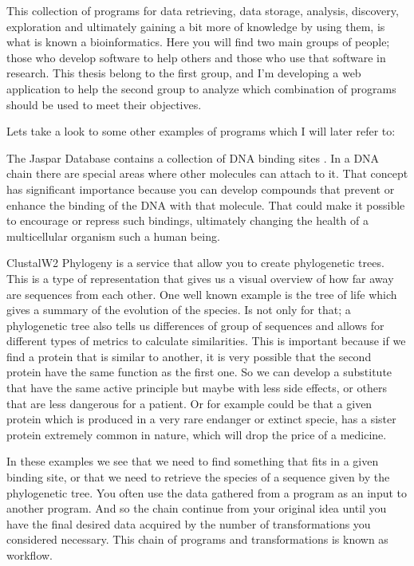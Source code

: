 \documentclass[a4paper,10pt]{article}
\begin{document}
This collection of programs for data retrieving, data storage, analysis, discovery, exploration and ultimately gaining a bit more of knowledge by using them, is what is known a bioinformatics. Here you will find two main groups of people; those who develop software to help others and those who use that software in research. This thesis belong to the first group, and I'm developing a web application to help the second group to analyze which combination of programs should be used to meet their objectives.\vspace{3 mm}

Lets take a look to some other examples of programs which I will later refer to:\vspace{3 mm}

The Jaspar Database \cite{PubMed_18006571} contains a collection of DNA binding sites \cite{wiki:001}. In a DNA chain there are special areas where other molecules can attach to it. That concept has significant importance because you can develop compounds that prevent or enhance the binding of the DNA with that molecule. That could make it possible to encourage or repress such bindings, ultimately changing the health of a multicellular organism such a human being.\vspace{3 mm}

ClustalW2 Phylogeny \cite{phylogeny} is a service that allow you to create phylogenetic trees. This is a type of representation that gives us a visual overview of how far away are sequences from each other. One well known example is the tree of life which gives a summary of the evolution of the species. Is not only for that; a phylogenetic tree also tells us differences of group of sequences and allows for different types of metrics to calculate similarities. This is important because if we find a protein that is similar to another, it is very possible that the second protein have the same function as the first one. So we can develop a substitute that have the same active principle but maybe with less side effects, or others that are less dangerous for a patient. Or for example could be that a given protein which is produced in a very rare endanger or extinct specie, has a sister protein extremely common in nature, which will drop the price of a medicine.\vspace{3 mm}

In these examples we see that we need to find something that fits in a given binding site, or that we need to retrieve the species of a sequence given by the phylogenetic tree. You often use the data gathered from a program as an input to another program. And so the chain continue from your original idea until you have the final desired data acquired by the number of transformations you considered necessary. This chain of programs and transformations is known as workflow.\vspace{3 mm}
\end{document}
